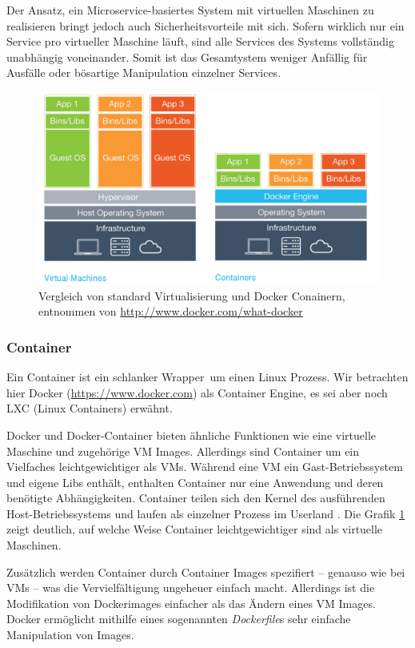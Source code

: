 Der Ansatz, ein Microservice-basiertes System mit virtuellen Maschinen zu realisieren bringt jedoch auch Sicherheitsvorteile mit sich. Sofern wirklich nur ein Service pro virtueller Maschine läuft, sind alle Services des Systems vollständig unabhängig voneinander. Somit ist das Gesamtystem weniger Anfällig für Ausfälle oder bösartige Manipulation einzelner Services.

\begin{figure}[h]
    \centering
    \includegraphics[scale=0.3]{img/container-vm.pdf}
    \caption{Vergleich von standard Virtualisierung und Docker Conainern, entnommen von \url{http://www.docker.com/what-docker}}
    \label{fig:container-vm}
\end{figure}

\subsubsection{Container}
Ein Container ist ein schlanker \glqq Wrapper\grqq\ um einen Linux Prozess. Wir betrachten hier Docker (\url{https://www.docker.com}) als Container Engine, es sei aber noch LXC (Linux Containers) erwähnt.

Docker und Docker-Container bieten ähnliche Funktionen wie eine virtuelle Maschine und zugehörige VM Images. Allerdings sind Container um ein Vielfaches leichtgewichtiger als VMs. Während eine VM ein Gast-Betriebssystem und eigene Libs enthält, enthalten Container nur eine Anwendung und deren benötigte Abhängigkeiten. Container teilen sich den Kernel des ausführenden Host-Betriebssystems und laufen als einzelner Prozess im Userland \cite{newman2015}. Die Grafik \ref{fig:container-vm} zeigt deutlich, auf welche Weise Container leichtgewichtiger sind als virtuelle Maschinen.

Zusätzlich werden Container durch Container Images spezifiert -- genauso wie bei VMs -- was die Vervielfältigung ungeheuer einfach macht. Allerdings ist die Modifikation von Dockerimages einfacher als das Ändern eines VM Images. Docker ermöglicht mithilfe eines sogenannten \textit{Dockerfile}s sehr einfache Manipulation von Images. 

